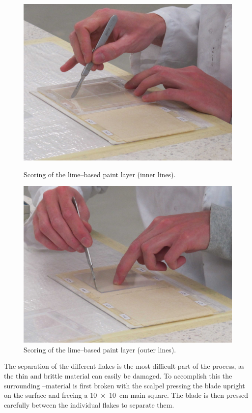 \documentclass[review]{elsarticle}
\begin{document}
\begin{figure}[htb]
  \centering
  \begin{minipage}[t]{0.48\textwidth}
  \includegraphics[width=\textwidth]{scoring_01}
  \caption{Scoring of the lime--based paint layer (inner lines).}
  \label{fig:scoring_01}
  \end{minipage}
  \hfill
  \begin{minipage}[t]{0.48\textwidth}
  \includegraphics[width=\textwidth]{scoring_02}
  \caption{Scoring of the lime--based paint layer (outer lines).}
  \label{fig:scoring_02}
  \end{minipage}
\end{figure}

The separation of the different flakes is the most difficult part of the process, as the thin and brittle material can easily be damaged.
To accomplish this the surrounding --material is first broken with the scalpel pressing the blade upright on the surface and freeing a \SI[product-units = single]{10 x 10}{\cm} main square.
The blade is then pressed carefully between the individual flakes to separate them.

\printglossary
\end{document}
